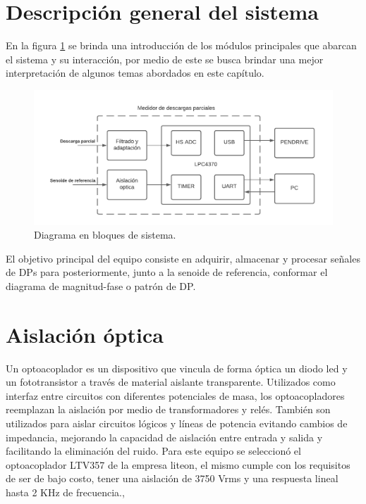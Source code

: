 \section{Descripción general del sistema}

En la figura \ref{fig:bloques} se brinda una introducción de los módulos principales que abarcan el sistema y su interacción, por medio de este se busca brindar una mejor interpretación de algunos temas abordados en este capítulo.

\begin{figure}[ht]
	\centering
	\includegraphics[width=\textwidth]{./Figures/bloques.png}
	\caption{Diagrama en bloques de sistema.}
	\label{fig:bloques}
\end{figure}

El objetivo principal del equipo consiste en adquirir, almacenar y procesar señales de DPs para posteriormente, junto a la senoide de referencia, conformar el diagrama de magnitud-fase o patrón de DP.

\section{Aislación óptica}
Un optoacoplador es un dispositivo que vincula de forma óptica un diodo led y un fototransistor a través  de material aislante transparente. Utilizados como interfaz entre circuitos con diferentes potenciales de masa, los optoacopladores reemplazan la aislación por medio de transformadores y relés. También son utilizados para aislar circuitos lógicos y líneas de potencia evitando cambios de impedancia, mejorando la capacidad de aislación entre entrada y salida y facilitando la eliminación del ruido. Para este equipo se seleccionó el optoacoplador LTV357 de la empresa liteon, el mismo cumple con los requisitos de ser de bajo costo, tener una aislación de 3750 Vrms y una respuesta lineal hasta 2 KHz de frecuencia.\citep{opto:appnote},\citep{opto:ltv357}

